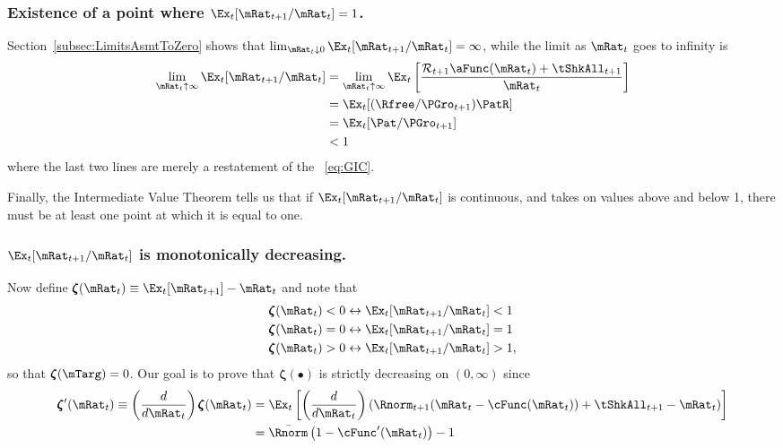 \documentclass[BufferStockTheory]{subfiles}
\begin{document}
\subsubsection{Existence of a point where $\Ex_t [{\mRat}_{t+1}/\mRat_t]=1$.}
Section~\ref{subsec:LimitsAsmtToZero} shows that $\lim_{\mRat_t \downarrow 0} 
\Ex_t [{\mRat}_{t+1}/\mRat_t] = \infty$, while the limit as $\mRat_{t}$ goes 
to infinity is
\begin{align}
  \lim_{\mRat_{t} \uparrow \infty} \Ex_{t}[{\mRat}_{t+1}/\mRat_{t}]  & =   
                                                                       \lim_{\mRat_{t} \uparrow \infty} 
                                                                       \Ex_{t}\left[\frac{{\mathcal{\mathcal{R}}}_{t+1}\aFunc(\mRat_{t})+{\tShkAll}_{t+1}}{\mRat_{t}}\right] \notag 
  \\  & = \Ex_{t}[(\Rfree/{\PGro}_{t+1})\PatR]
  \\  & = \Ex_{t}[{\Pat}/{\PGro}_{t+1}] \notag
  \\  & < 1 \notag
\end{align}
where the last two lines are merely a restatement of the \GIC~\eqref{eq:GIC}.

Finally, the Intermediate Value Theorem tells us that if $\Ex_t [{\mRat}_{t+1}/\mRat_t]$ is continuous, and takes on values above and below 1, there must be at least one point at which it is equal to one.

\subsubsection{$\Ex_t [{\mRat}_{t+1}/\mRat_t]$ is monotonically decreasing.}

  Now define \providecommand{\difFunc}{\pmb{\zeta}} $\difFunc(\mRat_t) \equiv 
\Ex_t[\mRat_{t+1}] - \mRat_t$ and note that
\begin{align}\label{eq:difRatioEquiv}
  \difFunc(\mRat_t) < 0 &\leftrightarrow \Ex_t[{\mRat}_{t+1}/\mRat_t] < 1 
                          \nonumber\\
  \difFunc(\mRat_t) = 0 &\leftrightarrow \Ex_t[{\mRat}_{t+1}/\mRat_t] = 1\\
  \difFunc(\mRat_t) > 0 &\leftrightarrow \Ex_t[{\mRat}_{t+1}/\mRat_t] > 
                          1,\nonumber
\end{align}
so that $\difFunc(\mTarg)=0$. Our goal is to prove that $\difFunc(\bullet)$ is strictly 
decreasing on $(0,\infty)$ since
\begin{align}
\difFunc^{\prime}(\mRat_{t}) \equiv  \left( \frac{d}{d\mRat_{t}}\right) \difFunc(\mRat_t)  & = \Ex_{t}\left[
                                                          \left( \frac{d}{d\mRat_{t}}\right) \left( 
                                                          {\Rnorm}_{t+1}(\mRat_{t}-\cFunc(\mRat_{t}))+%
                                                          {\tShkAll}_{t+1} - {\mRat}_t\right) \right] \label{eq:difFuncDecreases} \\
                                                        & = \bar{\Rnorm}\left(1-\cFunc^{\prime}({\mRat}_t)\right) - 1  \notag
\end{align}
\end{document}
